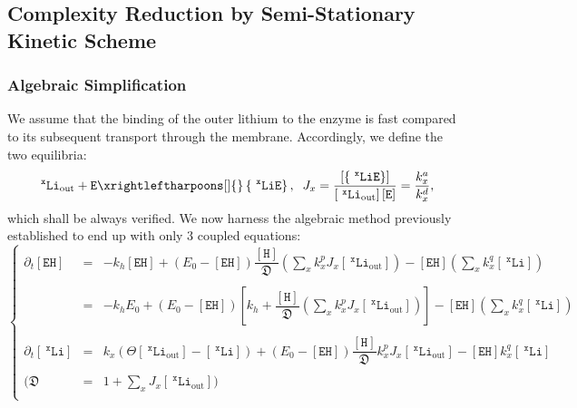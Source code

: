 \documentclass[aps,onecolumn,11pt]{revtex4}
\newcommand{\mychem}[1]{\mathtt{#1}}
\newcommand{\myconc}[1]{\left\lbrack{#1}\right\rbrack}
\newcommand{\spLi}[1]{{~^{\mychem{#1}}\mychem{Li}}}
\newcommand{\Li}[1]{\myconc{\spLi{#1}}}
\newcommand{\spEout}{\mychem{E}}
\newcommand{\Eout}{\myconc{\spEout}}
\newcommand{\spLiE}[1]{\left\lbrace\spLi{#1}\spEout\right\rbrace}
\newcommand{\LiE}[1]{\myconc{\spLiE{#1}}}
\newcommand{\spLiOut}[1]{{\spLi{#1}}_{\mathrm{out}}}
\newcommand{\LiOut}[1]{\myconc{\spLiOut{#1}}}
\newcommand{\spEHin}{\mychem{EH}}
\newcommand{\EHin}{\myconc{\spEHin}}
\newcommand{\spproton}{\mychem{H}}
\newcommand{\proton}{\myconc{\spproton}}
\newcommand{\todo}[1]{\framebox{\textbf{\color{WildStrawberry}{#1}}}}
\begin{document}
\subsection{Complexity Reduction by Semi-Stationary Kinetic Scheme}

\subsubsection{Algebraic Simplification}
We assume that the binding of the outer lithium to the enzyme is fast compared to its subsequent transport through the membrane. 
Accordingly, we define the two equilibria:
\begin{equation}
\label{eq:J}
\spLiOut{x} +  \spEout    \xrightleftharpoons[]{}  \spLiE{x}, \;\; J_x = \dfrac{\LiE{x}}{\LiOut{x} \Eout} = \dfrac{k_x^a}{k_x^d},
\end{equation}
which shall be always verified.
We now harness the algebraic method previously established\todo{ref} to end up with only 3 coupled equations:
\begin{equation}
\label{eq:sys}
\left\lbrace
	\begin{array}{rcl}
		\partial_t\EHin & = & -k_h \EHin + \left(E_0- \EHin\right) \dfrac{\proton}{\mathfrak{D}} \left(\sum_x k_x^p J_x\LiOut{x} \right)  
		- \EHin \left({\sum_x k_x^q \Li{x}} \right)
		\\
		\\
		& = & 
		-k_h E_0+ \left(E_0- \EHin\right)\left\lbrack k_h+ \dfrac{\proton}{\mathfrak{D}} \left(\sum_x k_x^p J_x\LiOut{x}\right)\right] 
		- \EHin \left( {\sum_x k_x^q \Li{x}} \right)
		\\
		\\
		\partial_t\Li{x} & = & k_x \left(\Theta\LiOut{x} -\Li{x} \right)  + \left(E_0-\EHin\right) \dfrac{\proton}{\mathfrak{D}}   k_x^p  J_x \LiOut{x}  
		- \EHin k_x^q \Li{x}
		\\
		\\
		(\mathfrak{D} & = & 1+\sum_x J_x \LiOut{x} )\\
	\end{array}
\right.
\end{equation}
\end{document}
